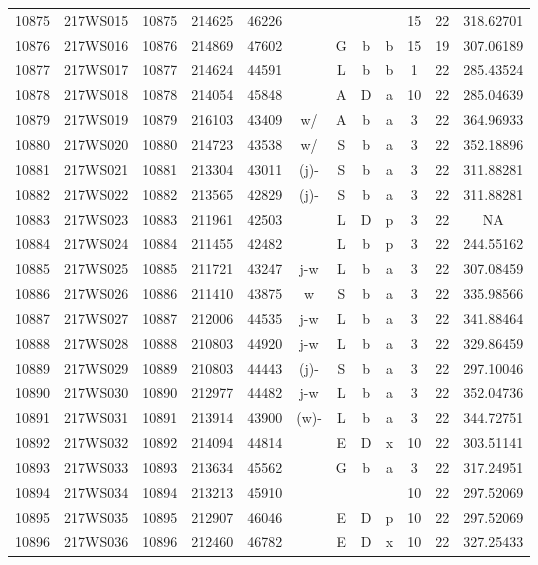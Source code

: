 \begin{tabular}{|*{12}{c|}}
10875 & 217WS015 & 10875 & 214625 & 46226 &  &  &  &  & 15 & 22 & 318.62701 \\ 
10876 & 217WS016 & 10876 & 214869 & 47602 &  & G & b & b & 15 & 19 & 307.06189 \\ 
10877 & 217WS017 & 10877 & 214624 & 44591 &  & L & b & b & 1 & 22 & 285.43524 \\ 
10878 & 217WS018 & 10878 & 214054 & 45848 &  & A & D & a & 10 & 22 & 285.04639 \\ 
10879 & 217WS019 & 10879 & 216103 & 43409 & w/ & A & b & a & 3 & 22 & 364.96933 \\ 
10880 & 217WS020 & 10880 & 214723 & 43538 & w/ & S & b & a & 3 & 22 & 352.18896 \\ 
10881 & 217WS021 & 10881 & 213304 & 43011 & (j)- & S & b & a & 3 & 22 & 311.88281 \\ 
10882 & 217WS022 & 10882 & 213565 & 42829 & (j)- & S & b & a & 3 & 22 & 311.88281 \\ 
10883 & 217WS023 & 10883 & 211961 & 42503 &  & L & D & p & 3 & 22 & NA \\ 
10884 & 217WS024 & 10884 & 211455 & 42482 &  & L & b & p & 3 & 22 & 244.55162 \\ 
10885 & 217WS025 & 10885 & 211721 & 43247 & j-w & L & b & a & 3 & 22 & 307.08459 \\ 
10886 & 217WS026 & 10886 & 211410 & 43875 & w & S & b & a & 3 & 22 & 335.98566 \\ 
10887 & 217WS027 & 10887 & 212006 & 44535 & j-w & L & b & a & 3 & 22 & 341.88464 \\ 
10888 & 217WS028 & 10888 & 210803 & 44920 & j-w & L & b & a & 3 & 22 & 329.86459 \\ 
10889 & 217WS029 & 10889 & 210803 & 44443 & (j)- & S & b & a & 3 & 22 & 297.10046 \\ 
10890 & 217WS030 & 10890 & 212977 & 44482 & j-w & L & b & a & 3 & 22 & 352.04736 \\ 
10891 & 217WS031 & 10891 & 213914 & 43900 & (w)- & L & b & a & 3 & 22 & 344.72751 \\ 
10892 & 217WS032 & 10892 & 214094 & 44814 &  & E & D & x & 10 & 22 & 303.51141 \\ 
10893 & 217WS033 & 10893 & 213634 & 45562 &  & G & b & a & 3 & 22 & 317.24951 \\ 
10894 & 217WS034 & 10894 & 213213 & 45910 &  &  &  &  & 10 & 22 & 297.52069 \\ 
10895 & 217WS035 & 10895 & 212907 & 46046 &  & E & D & p & 10 & 22 & 297.52069 \\ 
10896 & 217WS036 & 10896 & 212460 & 46782 &  & E & D & x & 10 & 22 & 327.25433 \\ 

\end{tabular}
